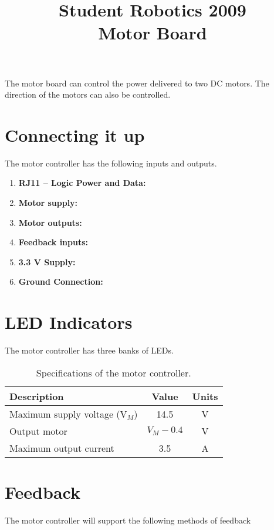 \documentclass[a4paper]{article}
\title{Student Robotics 2009\\ Motor Board}
\begin{document}
\maketitle

The motor board can control the power delivered to two DC motors.  The direction of the motors can also be controlled.  


\section{Connecting it up}
The motor controller has the following inputs and outputs.
\begin{enumerate}
\item \textbf{RJ11 -- Logic Power and Data:} 
\item \textbf{Motor supply:}
\item \textbf{Motor outputs:}
\item \textbf{Feedback inputs:}
\item \textbf{3.3 V Supply:}
\item \textbf{Ground Connection:}
\end{enumerate}

\section{LED Indicators}
The motor controller has three banks of LEDs.


\begin{table}
  \caption{\label{tab:numspecs}Specifications of the motor controller.}
  
  \begin{center}
    \begin{tabular}{|l|c|c|}
      \hline
      \textbf{Description} & \textbf{Value} & \textbf{Units} \\
      \hline
      Maximum supply voltage (V$_M$) & 14.5 & V \\
      Output motor & $V_M - 0.4$ & V \\
      Maximum output current & 3.5 & A \\
      \hline
    \end{tabular}
  \end{center}
\end{table}

\section{Feedback}

The motor controller will support the following methods of feedback 
\end{document}
